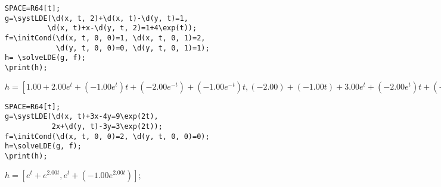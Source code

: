 \begin{verbatim}
SPACE=R64[t];
g=\systLDE(\d(x, t, 2)+\d(x, t)-\d(y, t)=1, 
          \d(x, t)+x-\d(y, t, 2)=1+4\exp(t));
f=\initCond(\d(x, t, 0, 0)=1, \d(x, t, 0, 1)=2, 
            \d(y, t, 0, 0)=0, \d(y, t, 0, 1)=1);
h= \solveLDE(g, f);  
\print(h);
\end{verbatim}

{$h = [1. 00+2. 00 e^{t}+(-1. 00 e^{t}) t+(-2. 00 e^{-t})+(-1. 00 e^{-t}) t, (-2. 00)+(-1. 00 t)+3. 00 e^{t}+(-2. 00 e^{t}) t+(-1. 00 e^{-t})];$}

\begin{verbatim}
SPACE=R64[t];
g=\systLDE(\d(x, t)+3x-4y=9\exp(2t), 
           2x+\d(y, t)-3y=3\exp(2t));
f=\initCond(\d(x, t, 0, 0)=2, \d(y, t, 0, 0)=0);
h=\solveLDE(g, f); 
\print(h);
\end{verbatim}

{$h = [e^{t}+e^{2. 00t}, e^{t}+(-1. 00 e^{2. 00t})];$}

